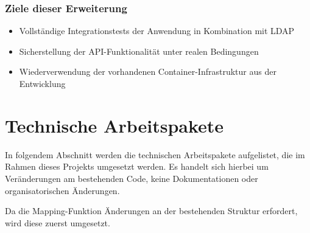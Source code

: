 \subsubsection*{Ziele dieser Erweiterung}

\begin{itemize}
  \item Vollständige Integrationstests der Anwendung in Kombination mit LDAP
  \item Sicherstellung der API-Funktionalität unter realen Bedingungen
  \item Wiederverwendung der vorhandenen Container-Infrastruktur aus der Entwicklung
\end{itemize}

\section{Technische Arbeitspakete}
In folgendem Abschnitt werden die technischen Arbeitspakete aufgelistet, die im Rahmen dieses Projekts umgesetzt werden. Es handelt sich hierbei um Veränderungen am bestehenden Code, keine Dokumentationen oder organisatorischen Änderungen.

Da die Mapping-Funktion Änderungen an der bestehenden Struktur erfordert, wird diese zuerst umgesetzt.

